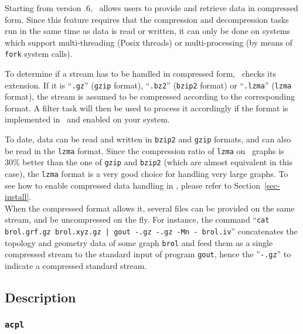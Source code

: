 Starting from version {.6}, \scotch\ allows users to provide
and retrieve data in compressed form. Since this feature requires that
the compression and decompression tasks run in the same time as data
is read or written, it can only be done on systems which support
multi-threading (Posix threads) or multi-processing (by means of
\texttt{fork} system calls).

To determine if a stream has to be handled in compressed form,
\scotch\ checks its extension. If it is ``\texttt{.gz}'' (\texttt{gzip}
format), ``\texttt{.bz2}'' (\texttt{bzip2} format) or ``\texttt{.lzma}''
(\texttt{lzma} format), the stream is assumed to be compressed according
to the corresponding format. A filter task will then be used to process
it accordingly if the format is implemented in \scotch\ and enabled on
your system.

To date, data can be read and written in \texttt{bzip2} and \texttt{gzip}
formats, and can also be read in the \texttt{lzma} format. Since the
compression ratio of \texttt{lzma} on \scotch\ graphs is $30\%$ better
than the one of \texttt{gzip} and \texttt{bzip2} (which are almost
equivalent in this case), the \texttt{lzma} format is a very good choice
for handling very large graphs. To see how to enable compressed data
handling in \scotch, please refer to Section~\ref{sec-install}.
\\

When the compressed format allows it, several files can be provided on
the same stream, and be uncompressed on the fly. For instance, the
command ``\texttt{cat brol.grf.gz brol.xyz.gz | gout -.gz -.gz -Mn -
brol.iv}'' concatenates the topology and geometry data of some graph
\texttt{brol} and feed them as a single compressed stream to the standard
input of program \texttt{gout}, hence the ''\texttt{-.gz}'' to indicate a
compressed standard stream.

\subsection{Description}

\subsubsection{\texttt{acpl}}

